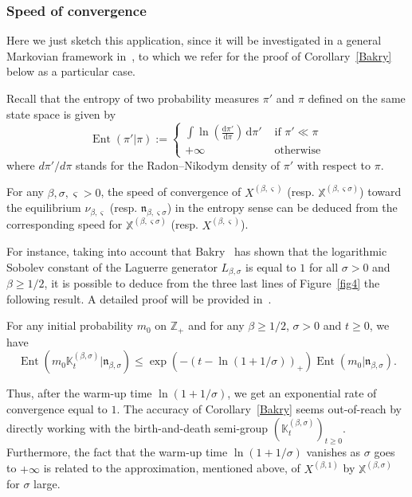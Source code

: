 \documentclass[AHL,Unicode,longabstracts]{cedram}
\DeclareMathOperator{\Ent}{Ent}
\newcommand{\df}{\mathrel{:=}}
\newcommand{\ZZ}{\mathbb{Z}}
\newcommand{\fn}{\mathfrak{n}}
\newcommand{\fX}{\mathbb{X}}
\newcommand{\iy}{\infty}
\newcommand{\lt}{\left}
\newcommand{\rt}{\right}
\newcommand{\Lg}{L}
\newcommand{\dLs}{{\discret{K}}}
\newcommand{\discret}[1]{\mathds{#1}}
\newcommand*{\dd}{\mathrm{d}}
\begin{document}
\subsubsection*{Speed of convergence}
Here we just sketch this application, since it will be investigated in a general Markovian framework in~\cite{intertwining}, to which we refer for the proof of Corollary~\ref{Bakry} below as a particular case.

Recall that the entropy of two probability measures $\pi'$ and $\pi$ defined on the same state space is given by
\[
\Ent(\pi'\vert\pi)\df
\begin{cases}
\int \ln\lt(\frac{\dd\pi'}{\dd\pi}\rt)\, \dd\pi'&\text{ if $\pi'\ll\pi$}\\
+\iy&\text{ otherwise}
\end{cases}
\]
where $d\pi'/d\pi$ stands for the Radon--Nikodym density of $\pi'$ with respect to $\pi$.

For any $\beta,\sigma,\varsigma>0$, the speed of convergence of $X^{(\beta,\varsigma)}$ (resp. $\fX^{(\beta,\varsigma\sigma)}$) toward the equilibrium $\nu_{\beta,\varsigma}$ (resp. $\fn_{\beta,\varsigma\sigma}$) in the entropy sense can be deduced from the corresponding speed for $\fX^{(\beta,\varsigma\sigma)}$ (resp. $X^{(\beta,\varsigma)}$).

For instance, taking into account that Bakry~\cite{MR1417973} has shown that the logarithmic Sobolev constant of the Laguerre generator $\Lg_{\beta,\sigma}$ is equal to $1$ for all $\sigma >0$ and $\beta\geq 1/2$, it is possible to deduce from the three last lines of Figure~\ref{fig4} the following result. A detailed proof will be provided in~\cite{intertwining}.

\begin{coro}\label{Bakry}
For any initial probability $m_0$ on $\ZZ_+$ and for any $\beta\geq 1/2$, $\sigma>0$ and $t\geq 0$, we have
\[
\Ent(m_0\dLs_t^{(\beta,\sigma)}\vert\fn_{\beta,\sigma})\leq \exp(-(t-\ln(1+1/\sigma))_+)\Ent(m_0\vert\fn_{\beta,\sigma}).
\]
\end{coro}


Thus, after the warm-up time $\ln(1+1/\sigma)$, we get an exponential rate of convergence equal to $1$. The accuracy of Corollary~\ref{Bakry} seems out-of-reach by directly working with the birth-and-death semi-group $(\dLs_t^{(\beta,\sigma)})_{t\geq 0}$. Furthermore, the fact that the warm-up time $\ln(1+1/\sigma)$ vanishes as $\sigma$ goes to $+\iy$ is related to the approximation, mentioned above, of $X^{(\beta,1)}$ by $\fX^{(\beta,\sigma)}$ for $\sigma$ large.
\end{document}
